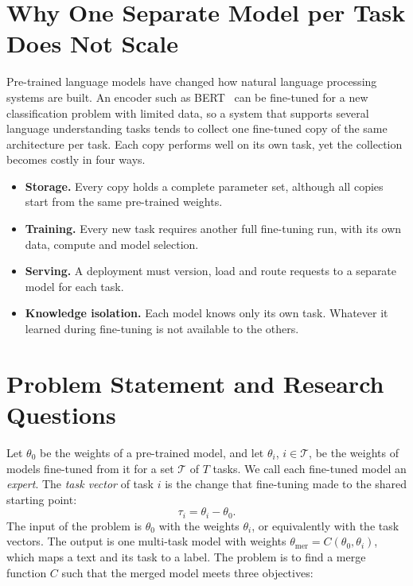 \section{Why One Separate Model per Task Does Not Scale}

Pre-trained language models have changed how natural language processing systems are built. An encoder such as BERT~\cite{devlin2019bert} can be fine-tuned for a new classification problem with limited data, so a system that supports several language understanding tasks tends to collect one fine-tuned copy of the same architecture per task. Each copy performs well on its own task, yet the collection becomes costly in four ways.

\begin{itemize}
  \item \textbf{Storage.} Every copy holds a complete parameter set, although all copies start from the same pre-trained weights.
  \item \textbf{Training.} Every new task requires another full fine-tuning run, with its own data, compute and model selection.
  \item \textbf{Serving.} A deployment must version, load and route requests to a separate model for each task.
  \item \textbf{Knowledge isolation.} Each model knows only its own task. Whatever it learned during fine-tuning is not available to the others.
\end{itemize}

\section{Problem Statement and Research Questions}
\label{sec:problem}

Let $\theta_0$ be the weights of a pre-trained model, and let $\theta_i$, $i\in\mathcal{T}$, be the weights of models fine-tuned from it for a set $\mathcal{T}$ of $T$ tasks. We call each fine-tuned model an \emph{expert}. The \emph{task vector} of task $i$ is the change that fine-tuning made to the shared starting point:
\begin{equation}
\tau_i=\theta_i-\theta_0 .
\label{eq:task-vector}
\end{equation}
The input of the problem is $\theta_0$ with the weights $\theta_i$, or equivalently with the task vectors. The output is one multi-task model with weights $\theta_{\mathrm{mer}}=C(\theta_0,\theta_i)$, which maps a text and its task to a label. The problem is to find a merge function $C$ such that the merged model meets three objectives:

